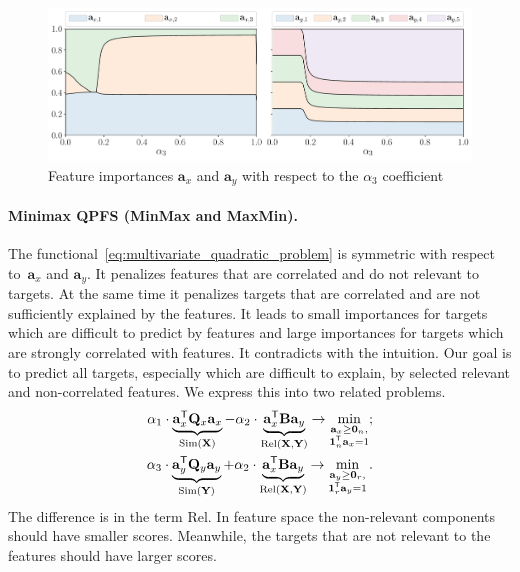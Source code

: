 \documentclass[12pt,twoside]{article}
\theoremstyle{definition}
\newcommand{\ba}{\mathbf{a}}
\newcommand{\bY}{\mathbf{Y}}
\newcommand{\bX}{\mathbf{X}}
\newcommand{\bQ}{\mathbf{Q}}
\newcommand{\T}{\mathsf{T}}
\newcommand{\bOne}{\boldsymbol{1}}
\newcommand{\bZero}{\boldsymbol{0}}
\begin{document}
\begin{figure}
	\centering
	\includegraphics[width=\linewidth]{figs/features_vs_alpha.pdf}
	\caption{Feature importances $\ba_x$ and $\ba_y$ with respect to the $\alpha_3$ coefficient}
	\label{fig:features_vs_alpha}
\end{figure}

\paragraph{Minimax QPFS (MinMax and MaxMin).}
The functional~\eqref{eq:multivariate_quadratic_problem} is symmetric with respect to~$\ba_x$ and $\ba_y$.
It penalizes features that are correlated and do not relevant to targets.
At the same time it penalizes targets that are correlated and are not sufficiently explained by the features.
It leads to small importances for targets which are difficult to predict by features and large importances for targets which are strongly correlated with features.
It contradicts with the intuition.
Our goal is to predict all targets, especially which are difficult to explain, by selected relevant and non-correlated features. We express this into two related problems.
\begin{align}
	\alpha_1 \cdot \underbrace{\ba_x^{\T} \bQ_x \ba_x}_{\text{Sim}(\bX)} - \alpha_2 \cdot \underbrace{\vphantom{()} \ba_x^{\T}\mathbf{B} \ba_y}_{\text{Rel}(\bX, \bY)} \rightarrow \min_{\substack{\ba_x \geq \bZero_n, \\ \bOne_n^{\T}\ba_x=1}};
	\label{eq:x_qpfs}\\
	\alpha_3 \cdot \underbrace{\ba_y^{\T} \bQ_y \ba_y}_{\text{Sim}(\bY)} + \alpha_2 \cdot \underbrace{\vphantom{()} \ba_x^{\T} \mathbf{B} \ba_y}_{\text{Rel}(\bX, \bY)} \rightarrow \min_{\substack{\ba_y \geq \bZero_r,  \\ \bOne_r^{\T}\ba_y=1}}.
	\label{eq:y_qpfs}
\end{align}
The difference is in the term Rel.
In feature space the non-relevant components should have smaller scores.
Meanwhile, the targets that are not relevant to the features should have larger scores.
\end{document}
